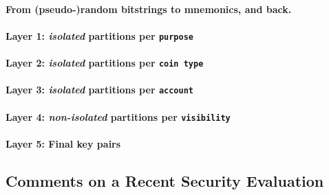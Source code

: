 \paragraph{From (pseudo-)random bitstrings to mnemonics, and back.}

\paragraph{Layer 1: \emph{isolated} partitions per \texttt{purpose}}

\paragraph{Layer 2: \emph{isolated} partitions per \texttt{coin type}}

\paragraph{Layer 3: \emph{isolated} partitions per \texttt{account}}

\paragraph{Layer 4: \emph{non-isolated} partitions per \texttt{visibility}}

\paragraph{Layer 5: Final key pairs}

\subsection{Comments on a Recent Security Evaluation}

\cite{def+21}

